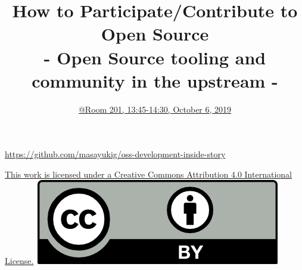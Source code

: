 \documentclass[aspectratio=169,11pt,hyperref={colorlinks=true}]{beamer}
\author[Masayuki Igawa]{%
    \texorpdfstring{%
        \begin{columns}
        \column{.7\linewidth}
            \centering
            Masayuki Igawa: \href{mailto:masayuki@igawa.io}{masayuki@igawa.io}\\
            \texttt{masayukig on
              \href{https://freenode.net/}{Freenode},
              \href{https://github.com/masayukig}{GitHub},
              \href{https://twitter.com/masayukig}{Twitter},
              \href{https://www.linkedin.com/in/masayukig/}{LinkedIn}}
        \end{columns}
        }
    {Masayuki Igawa}
}
\date{\href{https://events.opensuse.org/conferences/summitasia19/program/proposals/2762}{@Room 201, 13:45-14:30, October 6, 2019}}
\title[oss-development-inside-story
  \hspace{4em}\insertframenumber/\inserttotalframenumber]{How to Participate/Contribute to Open Source\\
  - Open Source tooling and community in the upstream -}
\begin{document}
{%
\begin{frame}[noframenumbering]
  \hypersetup{colorlinks,urlcolor=susedark}
  \titlepage{}
  \centering
  \@place \par
  \href{https://github.com/masayukig/oss-development-inside-story}{https://github.com/masayukig/oss-development-inside-story}
  \begin{flushright}
    \tiny\href{https://creativecommons.org/licenses/by/4.0/}{This work
      is licensed under a Creative Commons Attribution 4.0
      International License.}~\includegraphics[scale=0.3]{images/cc_by.png}
  \end{flushright}
\end{frame}
}
\end{document}
